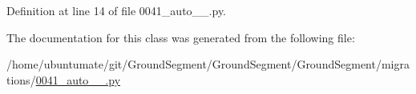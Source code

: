 Definition at line 14 of file 0041\+\_\+auto\+\_\+\_.\+py.



The documentation for this class was generated from the following file\+:\begin{DoxyCompactItemize}
\item 
/home/ubuntumate/git/\+Ground\+Segment/\+Ground\+Segment/\+Ground\+Segment/migrations/\hyperlink{0041__auto__20170131__2030_8py}{0041\+\_\+auto\+\_\+\_.\+py}\end{DoxyCompactItemize}

